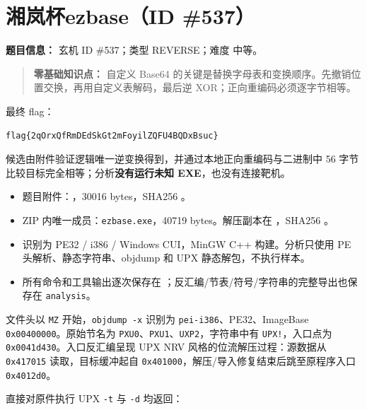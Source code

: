 \section{湘岚杯ezbase（ID \#537）}\label{ux6e58ux5c9aux676fezbaseid-537}

\textbf{题目信息：} 玄机 ID \#537；类型 REVERSE；难度 中等。

\begin{quote}
\textbf{零基础知识点：} 自定义 Base64 的关键是替换字母表和变换顺序。先撤销位置交换，再用自定义表解码，最后逆 XOR；正向重编码必须逐字节相等。
\end{quote}

最终 flag：

\begin{verbatim}
flag{2qOrxQfRmDEdSkGt2mFoyilZQFU4BQDxBsuc}
\end{verbatim}

候选由附件验证逻辑唯一逆变换得到，并通过本地正向重编码与二进制中 56 字节比较目标完全相等；分析\textbf{没有运行未知 EXE}，也没有连接靶机。

\begin{itemize}
\tightlist
\item
  题目附件：\texttt{}，30016 bytes，SHA256 \texttt{}。
\item
  ZIP 内唯一成员：\texttt{ezbase.exe}，40719 bytes。解压副本在 \texttt{}，SHA256 \texttt{}。
\item
  识别为 PE32 / i386 / Windows CUI，MinGW C++ 构建。分析只使用 PE 头解析、静态字符串、objdump 和 UPX 静态解包，不执行样本。
\item
  所有命令和工具输出逐次保存在 \texttt{}；反汇编/节表/符号/字符串的完整导出也保存在 \texttt{analysis}。
\end{itemize}

文件头以 \texttt{MZ} 开始，\texttt{objdump\ -x} 识别为 \texttt{pei-i386}、PE32、ImageBase \texttt{0x00400000}。原始节名为 \texttt{PXU0}、\texttt{PXU1}、\texttt{UXP2}，字符串中有 \texttt{UPX!}，入口点为 \texttt{0x0041d430}。入口反汇编呈现 UPX NRV 风格的位流解压过程：源数据从 \texttt{0x417015} 读取，目标缓冲起自 \texttt{0x401000}，解压/导入修复结束后跳至原程序入口 \texttt{0x4012d0}。

直接对原件执行 UPX \texttt{-t} 与 \texttt{-d} 均返回：

